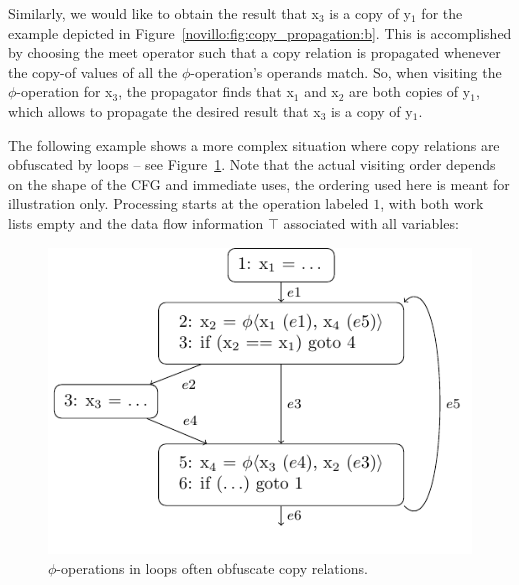 Similarly, we would like to obtain the result that x$_3$ is a copy of y$_1$ for
the example depicted in Figure~\ref{novillo:fig:copy_propagation:b}. This is
accomplished by choosing the meet operator such that a copy relation is
propagated whenever the copy-of values of all the $\phi$-operation's operands
match. So, when visiting the $\phi$-operation for x$_3$, the propagator finds
that x$_1$ and x$_2$ are both copies of y$_1$, which allows to propagate the
desired result that x$_3$ is a copy of y$_1$.

The following example shows a more complex situation where copy relations are
obfuscated by loops -- see Figure~\ref{novillo:fig:copy_propagation_loop}.  Note
that the actual visiting order depends on the shape of the CFG and immediate
uses, the ordering used here is meant for illustration only. Processing starts
at the operation labeled $1$, with both work lists empty and the data flow
information $\top$ associated with all variables:

\begin{figure}[b!]
  \begin{center}
    \includegraphics{copy_propagation_loop}
  \end{center}
  \vspace{-1em}
  \caption{$\phi$-operations in loops often obfuscate copy relations.}
  \label{novillo:fig:copy_propagation_loop}
\end{figure}

